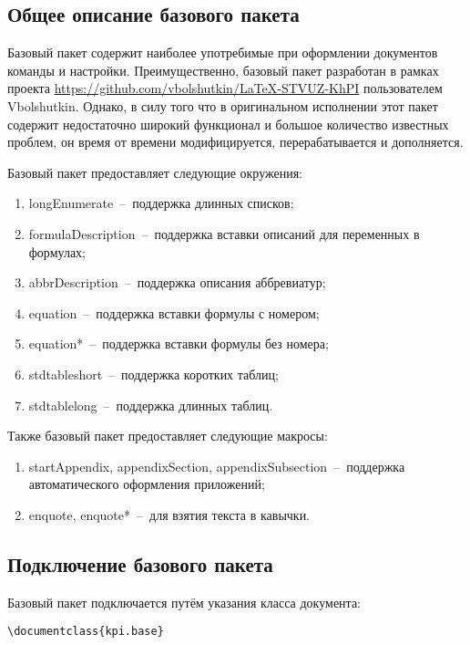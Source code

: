 \subsection{Общее описание базового пакета}
Базовый пакет содержит наиболее употребимые при оформлении документов команды и настройки. Преимущественно, базовый пакет разработан в рамках проекта \url{https://github.com/vbolshutkin/LaTeX-STVUZ-KhPI} пользователем Vbolshutkin. Однако, в силу того что в оригинальном исполнении этот пакет содержит недостаточно широкий функционал и большое количество известных проблем, он время от времени модифицируется, перерабатывается и дополняется.\par
Базовый пакет предоставляет следующие окружения:
\begin{enumerate}
\item longEnumerate~--~поддержка длинных списков;
\item formulaDescription~--~поддержка вставки описаний для переменных в формулах;
\item abbrDescription~--~поддержка описания аббревиатур;
\item equation~--~поддержка вставки формулы с номером;
\item equation*~--~поддержка вставки формулы без номера;
\item stdtableshort~--~поддержка коротких таблиц;
\item stdtablelong~--~поддержка длинных таблиц.
\end{enumerate}

Также базовый пакет предоставляет следующие макросы:
\begin{enumerate}
  \item startAppendix, appendixSection, appendixSubsection~--~поддержка автоматического оформления приложений;
  \item enquote, enquote*~--~для взятия текста в кавычки.
\end{enumerate}
\subsection{Подключение базового пакета}
Базовый пакет подключается путём указания класса документа:
{\small
\begin{verbatim}
\documentclass{kpi.base}
\end{verbatim}}
\normalsize